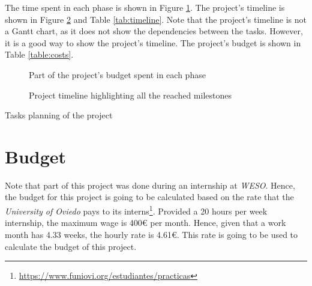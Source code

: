 The time spent in each phase is shown in Figure \ref{fig:pie}. The project's timeline is shown in Figure \ref{fig:timeline} and Table \ref{tab:timeline}. Note that the project's timeline is not a Gantt chart, as it does not show the dependencies between the tasks. However, it is a good way to show the project's timeline. The project's budget is shown in Table \ref{table:costs}.

\begin{figure}[ht]
    \centering
    \begin{adjustbox}{max width=0.66\textwidth}
    \end{adjustbox}
    \caption{Part of the project's budget spent in each phase}
    \label{fig:pie}
\end{figure}

\begin{figure}[p]
    \centering
    
    \caption{Project timeline highlighting all the reached milestones}
    \label{fig:timeline}
\end{figure}

\begin{table}[p]
    \centering
    
    \caption{Tasks planning of the project}
    \label{tab:timeline}
\end{table}

\section{Budget}

Note that part of this project was done during an internship at \textit{WESO}. Hence, the budget for this project is going to be calculated based on the rate that the \textit{University of Oviedo} pays to its interns\footnote{\url{https://www.funiovi.org/estudiantes/practicas}}. Provided a 20 hours per week internship, the maximum wage is 400€ per month. Hence, given that a work month has 4.33 weeks, the hourly rate is 4.61€. This rate is going to be used to calculate the budget of this project.

